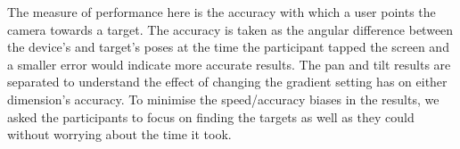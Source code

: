 \documentclass[sigconf, screen=true, anonymous=true]{acmart}
\begin{document}
The measure of performance here is the accuracy with which a user points the camera towards a target.
The accuracy is taken as the angular difference between the device's and target's poses at the time the participant tapped the screen and a smaller error would indicate more accurate results.
The pan and tilt results are separated to understand the effect of changing the gradient setting has on either dimension's accuracy.
To minimise the speed/accuracy biases in the results, we asked the participants to focus on finding the targets as well as they could without worrying about the time it took.  




\end{document}
